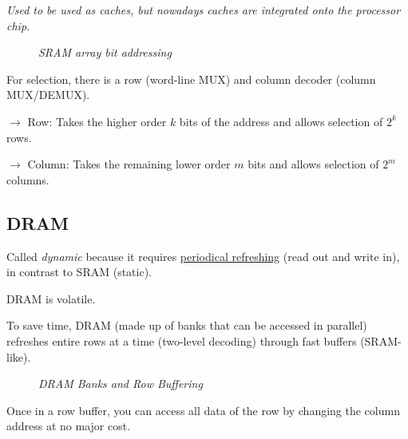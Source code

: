 \documentclass[11pt]{article}
\begin{document}
\textit{Used to be used as caches, but nowadays caches are integrated onto the processor chip.}

\begin{figure}[htbp]
    \centering
    \caption{\textit{SRAM array bit addressing}}
\end{figure}

For selection, there is a row (word-line MUX) and column decoder (column MUX/DEMUX).

$\rightarrow$ Row: Takes the higher order $k$ bits of the address and allows selection of $2^k$ rows.

$\rightarrow$ Column: Takes the remaining lower order $m$ bits and allows selection of $2^m$ columns.

\subsection*{DRAM}

Called \textit{dynamic} because it requires \underline{periodical refreshing} (read out and write in), in contrast to SRAM (static).

DRAM is volatile.

To save time, DRAM (made up of banks that can be accessed in parallel) refreshes entire rows at a time (two-level decoding) through fast buffers (SRAM-like).

\begin{figure}[htbp]
    \centering
    \caption{\textit{DRAM Banks and Row Buffering}}
\end{figure}

Once in a row buffer, you can access all data of the row by changing the column address at no major cost.
\end{document}
